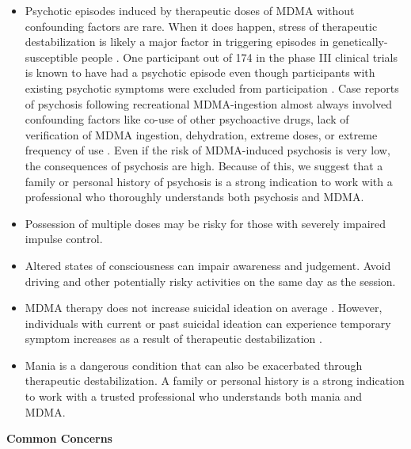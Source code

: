 \documentclass[12pt,letterpaper]{book}
\begin{document}
\begin{itemize}
    \item Psychotic episodes induced by therapeutic doses of MDMA without confounding factors are rare. When it does happen, stress of therapeutic destabilization is likely a major factor in triggering episodes in genetically-susceptible people \cite{winkelPsychosisStress}. One participant out of 174 in the phase III clinical trials is known to have had a psychotic episode even though participants with existing psychotic symptoms were excluded from participation \cite{studyingHarms,smithSystematic,mitchellMDMAClinicalTrial2}. Case reports of psychosis following recreational MDMA-ingestion almost always involved confounding factors like co-use of other psychoactive drugs, lack of verification of MDMA ingestion, dehydration, extreme doses, or extreme frequency of use \cite{mcguirePsychosis,patelPsychosis,vaivaPsychosis}. Even if the risk of MDMA-induced psychosis is very low, the consequences of psychosis are high. Because of this, we suggest that a family or personal history of psychosis is a strong indication to work with a professional who thoroughly understands both psychosis and MDMA.
    \item Possession of multiple doses may be risky for those with severely impaired impulse control.
    \item Altered states of consciousness can impair awareness and judgement. Avoid driving and other potentially risky activities on the same day as the session.
    \item MDMA therapy does not increase suicidal ideation on average \cite{mitchellMDMAClinicalTrial,mitchellMDMAClinicalTrial2}. However, individuals with current or past suicidal ideation can experience temporary symptom increases as a result of therapeutic destabilization \cite{studyingHarms}.  
    \item Mania is a dangerous condition that can also be exacerbated through therapeutic destabilization. A family or personal history is a strong indication to work with a trusted professional who understands both mania and MDMA. 
\end{itemize}
\noindent \textbf{Common Concerns}
\end{document}
